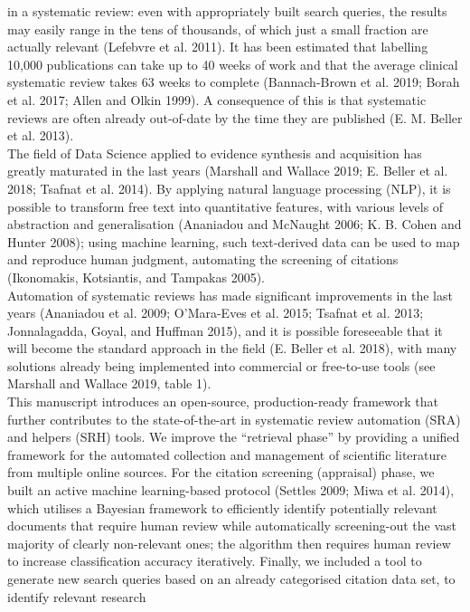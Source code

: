 \documentclass{article}
\begin{document}
in a systematic review: even with appropriately built search queries,
the results may easily range in the tens of thousands, of which just a
small fraction are actually relevant (Lefebvre et al. 2011). It has been
estimated that labelling 10,000 publications can take up to 40 weeks of
work and that the average clinical systematic review takes 63 weeks to
complete (Bannach-Brown et al. 2019; Borah et al. 2017; Allen and Olkin
1999). A consequence of this is that systematic reviews are often
already out-of-date by the time they are published (E. M. Beller et al.
2013).\\
The field of Data Science applied to evidence synthesis and acquisition
has greatly maturated in the last years (Marshall and Wallace 2019; E.
Beller et al. 2018; Tsafnat et al. 2014). By applying natural language
processing (NLP), it is possible to transform free text into
quantitative features, with various levels of abstraction and
generalisation (Ananiadou and McNaught 2006; K. B. Cohen and Hunter
2008); using machine learning, such text-derived data can be used to map
and reproduce human judgment, automating the screening of citations
(Ikonomakis, Kotsiantis, and Tampakas 2005).\\
Automation of systematic reviews has made significant improvements in
the last years (Ananiadou et al. 2009; O'Mara-Eves et al. 2015; Tsafnat
et al. 2013; Jonnalagadda, Goyal, and Huffman 2015), and it is possible
foreseeable that it will become the standard approach in the field (E.
Beller et al. 2018), with many solutions already being implemented into
commercial or free-to-use tools (see Marshall and Wallace 2019, table
1).\\
This manuscript introduces an open-source, production-ready framework
that further contributes to the state-of-the-art in systematic review
automation (SRA) and helpers (SRH) tools. We improve the ``retrieval
phase'' by providing a unified framework for the automated collection
and management of scientific literature from multiple online sources.
For the citation screening (appraisal) phase, we built an active machine
learning-based protocol (Settles 2009; Miwa et al. 2014), which utilises
a Bayesian framework to efficiently identify potentially relevant
documents that require human review while automatically screening-out
the vast majority of clearly non-relevant ones; the algorithm then
requires human review to increase classification accuracy iteratively.
Finally, we included a tool to generate new search queries based on an
already categorised citation data set, to identify relevant research
\end{document}
